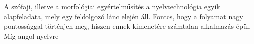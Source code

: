 A szófaji, illetve a morfológiai egyértelműsítés a nyelvtechnológia egyik alapfeladata, mely egy feldolgozó lánc elején áll. Fontos, hogy a folyamat nagy pontossággal történjen meg, hiszen ennek kimenetére számtalan alkalmazás épül. Míg angol nyelvre 
